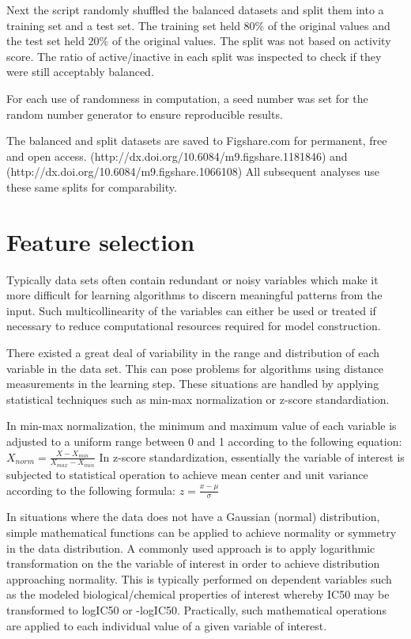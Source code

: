 Next the script randomly shuffled the balanced datasets and split them into a training set and a test set. The training set held 80\% of the original values and the test set held 20\% of the original values. The split was not based on activity score. The ratio of active/inactive in each split was inspected to check if they were still acceptably balanced.

For each use of randomness in computation, a seed number was set for the random number generator to ensure reproducible results.  

The balanced and split datasets are saved to Figshare.com for permanent, free and open access. (http://dx.doi.org/10.6084/m9.figshare.1181846) and \\
(http://dx.doi.org/10.6084/m9.figshare.1066108) All subsequent analyses use these same splits for comparability.

\section{Feature selection}

Typically data sets often contain redundant or noisy variables which make it more difficult for learning algorithms to discern meaningful patterns from the input. Such multicollinearity of the variables can either be used or treated if necessary to reduce computational resources required for model construction. \cite{Nantasenamat2009}

There existed a great deal of variability in the range and distribution of each variable in the data set. This can pose problems for algorithms using distance measurements in the learning step. These situations are handled by applying statistical techniques such as min-max normalization or z-score standardiation. 

In min-max normalization, the minimum and maximum value of each variable is adjusted to a uniform range between 0 and 1 according to the following equation: $ X_{norm} = \frac{X - X_{min}}{X_{max} - X_{min}}  $ In z-score standardization, essentially the variable of interest is subjected to statistical operation to achieve mean center and unit variance according to the following formula: $ z = \frac{x - \mu}{\sigma}  $ \cite{Nantasenamat2009}

In situations where the data does not have a Gaussian (normal) distribution, simple mathematical functions can be applied to achieve normality or symmetry in the data distribution. A commonly used approach is to apply logarithmic transformation on the the variable of interest in order to achieve distribution approaching normality. This is typically performed on dependent variables such as the modeled biological/chemical properties of interest whereby IC50 may be transformed to logIC50 or -logIC50. Practically, such mathematical operations are applied to each individual value of a given variable of interest. \cite{Nantasenamat2009}

